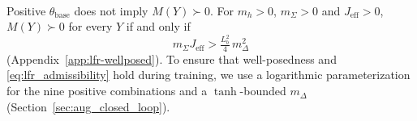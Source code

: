 \\
Positive $\theta_{\mathrm{base}}$ does not imply $M(Y)\succ0$. For
$m_h>0$, $m_\Sigma>0$ and $J_{\mathrm{eff}}>0$, $M(Y)\succ0$ for every $Y$ if and only if
\begin{equation}
  m_\Sigma J_{\mathrm{eff}}>\tfrac{L_b^2}{4}\,m_\Delta^2
  \label{eq:lfr_admissibility}
\end{equation}
(Appendix~\ref{app:lfr-wellposed}). 
To ensure that well-posedness and \eqref{eq:lfr_admissibility} 
hold during training, we use a logarithmic parameterization for 
the nine positive combinations and a $\tanh$-bounded $m_\Delta$
(Section~\ref{sec:aug_closed_loop}).
